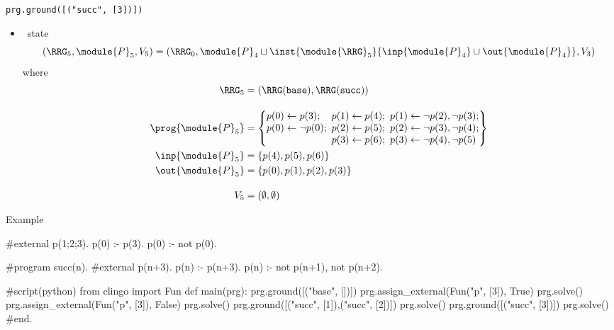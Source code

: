 \begin{frame}{\texttt{prg.ground([("succ", [3])])}}
  \begin{itemize}
  \item {} \clingo\ state
    \[
    (\boldsymbol{\RRG}_5,\module{P}_5,V_5 )
    =
    (\boldsymbol{\RRG}_0,\module{P}_4\sqcup\inst{\module{\RRG}_5}{\inp{\module{P}_4}\cup\out{\module{P}_4}},V_3)
    \]
    where
    \begin{align*}
      \boldsymbol{\RRG}_5 & {} = (\RRG(\mathtt{base}),\RRG(\mathtt{succ}))
      \\[10pt]
      \prog{\module{P}_5}
      & {} =
      \left\{
        \begin{array}{@{}l@{}}
          p(0)\leftarrow p(3);\quad   p(1)\leftarrow p(4);\ p(1)\leftarrow \neg p(2),\neg p(3);
          \\
          p(0)\leftarrow \neg p(0);\ p(2)\leftarrow p(5);\ p(2)\leftarrow \neg p(3),\neg p(4);
          \\
          \phantom{p(0)\leftarrow \neg p(0);\ }\,p(3)\leftarrow p(6);\ p(3)\leftarrow \neg p(4),\neg p(5)
        \end{array}
      \right\}
      \\
      \inp{\module{P}_5}
      & {} =
      \left\{
        p(4),
        p(5),
        p(6)
      \right\}
      \\
      \out{\module{P}_5}
      & {} =
      \left\{
        p(0),p(1),p(2), p(3)
      \right\}
      \\[10pt]
      V_5 & {} = (\emptyset,\emptyset)
    \end{align*}
  \end{itemize}
\end{frame}
\begin{frame}[fragile]{Example}
\scriptsize\vspace{-10pt}%
\begin{semiverbatim}
   #external p(1;2;3).
   p(0) :- p(3).
   p(0) :- not p(0).

   #program succ(n).
   #external p(n+3).
   p(n) :- p(n+3).
   p(n) :- not p(n+1), not p(n+2).

   #script(python)
   from clingo import Fun
   def main(prg):
       prg.ground([("base", [])])
       prg.assign_external(Fun("p", [3]), True)
       prg.solve()
       prg.assign_external(Fun("p", [3]), False)
       prg.solve()
       prg.ground([("succ", [1]),("succ", [2])])
       prg.solve()
     \alert<1>{prg.ground([("succ", [3])])}
     \alert<2>{prg.solve()}
   #end.
\end{semiverbatim}
\end{frame}
